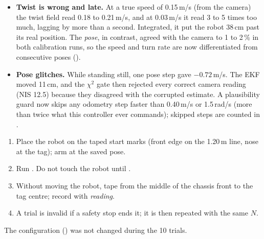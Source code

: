 \begin{itemize}
  \item \textbf{Twist is wrong and late.} At a true speed of 0.15\,m/s (from the camera) the twist field read
        0.18 to 0.21\,m/s, and at 0.03\,m/s it read 3 to 5 times too much, lagging by more than a second. Integrated, it
        put the robot 38\,cm past its real position. The  \emph{pose}, in contrast, agreed with the camera to
        1 to 2\,\% in both calibration runs, so the speed and turn rate are now differentiated from consecutive poses
        ().
  \item \textbf{Pose glitches.} While standing still, one pose step gave $-0.72$\,m/s. The EKF moved 11\,cm, and the
        $\chi^2$ gate then rejected every correct camera reading (NIS 12.5) because they disagreed with the corrupted
        estimate. A plausibility guard now skips any odometry step faster than 0.40\,m/s or 1.5\,rad/s (more than
        twice what this controller ever commands); skipped steps are counted in .
\end{itemize}

\begin{enumerate}
  \item Place the robot on the taped start marks (front edge on the 1.20\,m line, nose at the tag); arm at the saved pose.
  \item Run . Do not touch the robot until .
  \item Without moving the robot, tape from the middle of the chassis front to the tag centre; record with
         \textit{reading}.
  \item A trial is invalid if a safety stop ends it; it is then repeated with the same $N$.
\end{enumerate}
The configuration () was not changed during the 10 trials.
